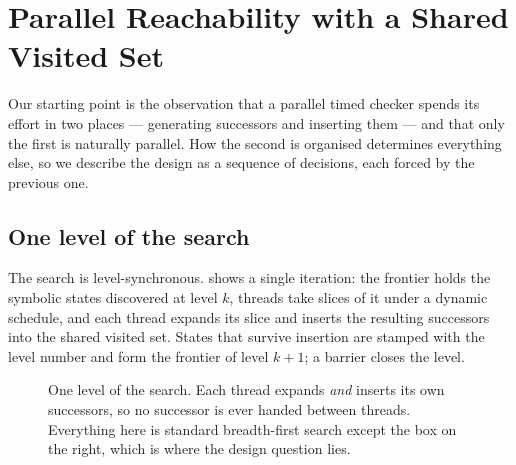 \section{Parallel Reachability with a Shared Visited Set}\label{sec:approach}

Our starting point is the observation that a parallel timed checker spends its effort in two
places --- generating successors and inserting them --- and that only the first is naturally
parallel. How the second is organised determines everything else, so we describe the design as
a sequence of decisions, each forced by the previous one.

\subsection{One level of the search}

The search is level-synchronous.  shows a single iteration: the frontier holds
the symbolic states discovered at level $k$, threads take slices of it under a dynamic
schedule, and each thread expands its slice and inserts the resulting successors into the
shared visited set. States that survive insertion are stamped with the level number and form
the frontier of level $k{+}1$; a barrier closes the level.

\begin{figure}[t]
\centering
{}
\caption{One level of the search. Each thread expands \emph{and} inserts its own successors,
so no successor is ever handed between threads. Everything here is standard breadth-first
search except the box on the right, which is where the design question lies.}
\label{fig:level}
\end{figure}

